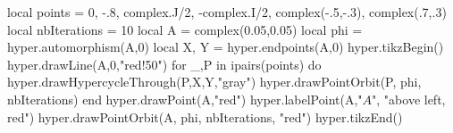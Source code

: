 \documentclass[margin=.2cm,multi,tikz]{standalone}
\begin{document}
\begin{luacode*}
local points = {0, -.8, complex.J/2, -complex.I/2, complex(-.5,-.3), complex(.7,.3)}
local nbIterations = 10
local A = complex(0.05,0.05)
local phi = hyper.automorphism(A,0)
local X, Y = hyper.endpoints(A,0)
hyper.tikzBegin()
hyper.drawLine(A,0,"red!50")
for _,P in ipairs(points) do
	hyper.drawHypercycleThrough(P,X,Y,"gray")
	hyper.drawPointOrbit(P, phi, nbIterations) 
end
hyper.drawPoint(A,"red")
hyper.labelPoint(A,"$A$", "above left, red")
hyper.drawPointOrbit(A, phi, nbIterations, "red") 
hyper.tikzEnd()
\end{luacode*}
\end{document}
